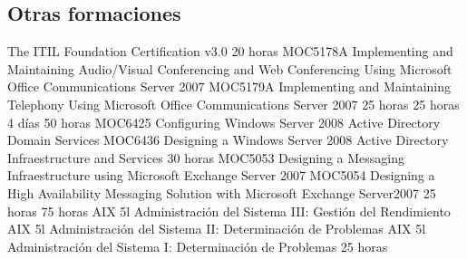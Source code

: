 \documentclass[11pt,a4paper]{moderncv}
\begin{document}
\subsection{Otras formaciones}
 {\scriptsize{
The ITIL Foundation Certification v3.0}}
 {20 horas}{\scriptsize{
MOC5178A Implementing and Maintaining Audio/Visual Conferencing and Web Conferencing Using Microsoft Office Communications Server 2007\newline
MOC5179A Implementing and Maintaining Telephony Using Microsoft Office Communications Server 2007}}
 {25 horas}{}
 {25 horas}{}
 {4 d\'ias}{}
 {50 horas}{\scriptsize{
MOC6425 Configuring Windows Server 2008 Active Directory Domain Services \newline
MOC6436 Designing a Windows Server 2008 Active Directory Infraestructure and Services}}
 {30 horas}{\scriptsize{
MOC5053 Designing a Messaging Infraestructure using Microsoft Exchange Server 2007\newline
MOC5054 Designing a High Availability Messaging Solution with Microsoft Exchange Server2007}}
 {25 horas}{}
 {75 horas}{\scriptsize{
AIX 5l Administraci\'on del Sistema III: Gesti\'on del Rendimiento\newline
AIX 5l Administraci\'on del Sistema II: Determinaci\'on de Problemas\newline
AIX 5l Administraci\'on del Sistema I: Determinaci\'on de Problemas}}
 {25 horas}{} 
\end{document}
